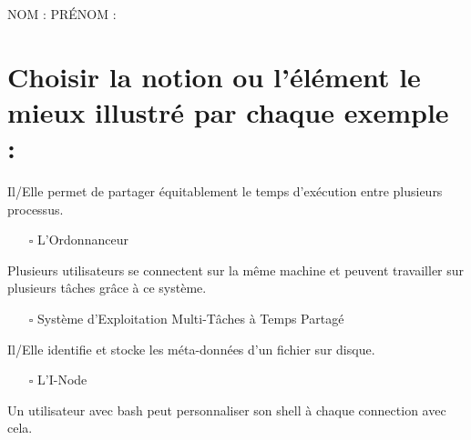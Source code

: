 \documentclass[11pt,a4paper]{article}
\author{Fabrice BOISSIER}
\newcommand{\CaseCoche}{\fontsize{20}{20}\selectfont $ \square $}
\begin{document}
\setlength{\fboxrule}{2pt}

\noindent {}

\bigskip

NOM : \hspace{6.5cm} PR\'ENOM :

\smallskip

\section{Choisir la notion ou l'élément le mieux illustré par chaque exemple : }

\medskip
\noindent Il/Elle permet de partager équitablement le temps d'exécution entre plusieurs processus.\\

\begin{itemize}
\item[\CaseCoche] L'Ordonnanceur\\
\end{itemize}

\bigskip
\noindent Plusieurs utilisateurs se connectent sur la même machine et peuvent travailler sur plusieurs tâches grâce à ce système.\\

\begin{itemize}
\item[\CaseCoche] Système d'Exploitation Multi-Tâches à Temps Partagé\\
\end{itemize}

\bigskip
\noindent Il/Elle identifie et stocke les méta-données d'un fichier sur disque.\\

\begin{itemize}
\item[\CaseCoche] L'I-Node\\
\end{itemize}

\bigskip
\noindent Un utilisateur avec bash peut personnaliser son shell à chaque connection avec cela.\\
\end{document}

